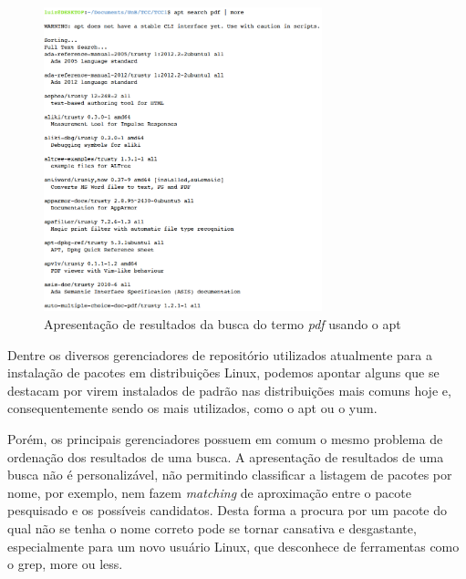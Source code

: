 \begin{figure}[h]
  \centering
	\includegraphics[width=0.72\textwidth]{figuras/search_pdf_ii}
  \caption{Apresentação de resultados da busca do termo \textit{pdf} usando o {\code apt}}
  \label{fig:figuras_search_pdf_ii}
\end{figure}


Dentre os diversos gerenciadores de repositório utilizados atualmente para a instalação de pacotes em distribuições Linux, podemos apontar alguns que se destacam por virem instalados de padrão nas distribuições mais comuns hoje e, consequentemente sendo os mais  utilizados, como o {\code apt} ou o {\code yum}.

Porém, os principais gerenciadores possuem em comum o mesmo problema de ordenação dos resultados de uma busca. A apresentação de resultados de uma busca não é personalizável, não permitindo classificar a listagem de pacotes por nome, por exemplo, nem fazem \textit{matching} de aproximação  entre o pacote pesquisado e os possíveis candidatos. Desta forma a procura por um pacote do qual não se tenha o nome correto pode se tornar cansativa e desgastante, especialmente para um novo usuário Linux, que desconhece de ferramentas como o {\code grep, more} ou {\code  less}. 


